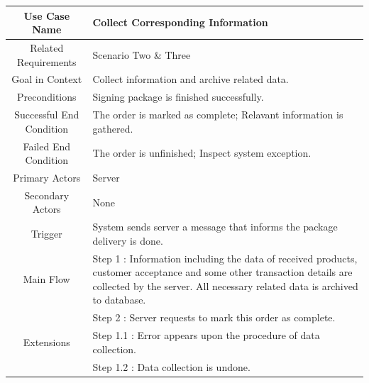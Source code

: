 \documentclass[12pt]{scrreprt}
\begin{document}
\begin{table}
  \centering
  \begin{tabular}{| c | p{11cm} |}
    \hline
    Use Case Name & Collect Corresponding Information\\
    \hline
    Related Requirements & Scenario Two \& Three\\
    \hline
    Goal in Context & Collect information and archive related data.\\
    \hline
    Preconditions & Signing package is finished successfully.\\
    \hline
    Successful End Condition & The order is marked as complete; Relavant
    information is gathered.\\
    \hline
    Failed End Condition & The order is unfinished; Inspect system exception.\\
    \hline
    Primary Actors & Server\\
    \hline
    Secondary Actors & None\\
    \hline
    Trigger & System sends server a message that informs the package delivery
    is done.\\
    \hline
    Main Flow & Step 1 : Information including the data of received products,
    customer acceptance and some other transaction details are collected by
    the server. All necessary related data is archived to database.\\
    & Step 2 : Server requests to mark this order as complete.\\
    \hline
    Extensions & Step 1.1 : Error appears upon the procedure of data
    collection.\\
    & Step 1.2 : Data collection is undone.\\
    \hline
  \end{tabular}
\end{table}
\end{document}
